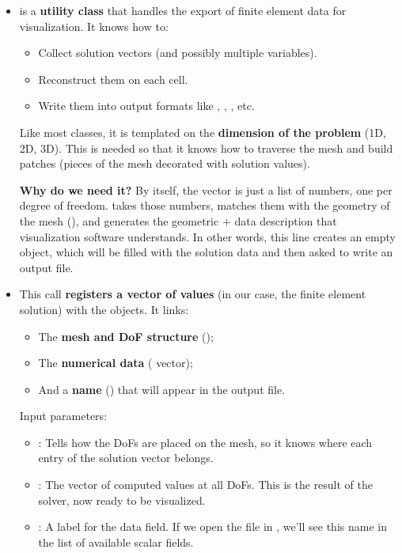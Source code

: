 \begin{itemize}
    \item {}  is a  \textbf{utility class} that handles the export of finite element data for visualization. It knows how to:
    \begin{itemize}
        \item Collect solution vectors (and possibly multiple variables).
        \item Reconstruct them on each cell.
        \item Write them into output formats like , , , etc.
    \end{itemize}
    Like most  classes, it is templated on the \textbf{dimension of the problem} (1D, 2D, 3D). This is needed so that it knows how to traverse the mesh and build patches (pieces of the mesh decorated with solution values).

    \textcolor{Green3}{ \textbf{Why do we need it?}} By itself, the vector  is just a list of numbers, one per degree of freedom.  takes those numbers, matches them with the geometry of the mesh (), and generates the geometric $+$ data description that visualization software understands. In other words, this line creates an empty  object, which will be filled with the solution data and then asked to write an output file.
    

    \item {}
    
    This call \textbf{registers a vector of values} (in our case, the finite element solution) with the  objects. It links:
    \begin{itemize}
        \item The \textbf{mesh and DoF structure} ();
        \item The \textbf{numerical data} ( vector);
        \item And a \textbf{name} () that will appear in the output file.
    \end{itemize}
    Input parameters:
    \begin{itemize}
        \item {}: Tells  how the DoFs are placed on the mesh, so it knows where each entry of the solution vector belongs.
        \item {}: The vector of computed values at all DoFs. This is the result of the solver, now ready to be visualized.
        \item {}: A label for the data field. If we open the  file in , we'll see this name in the list of available scalar fields.
    \end{itemize}


\end{itemize}
